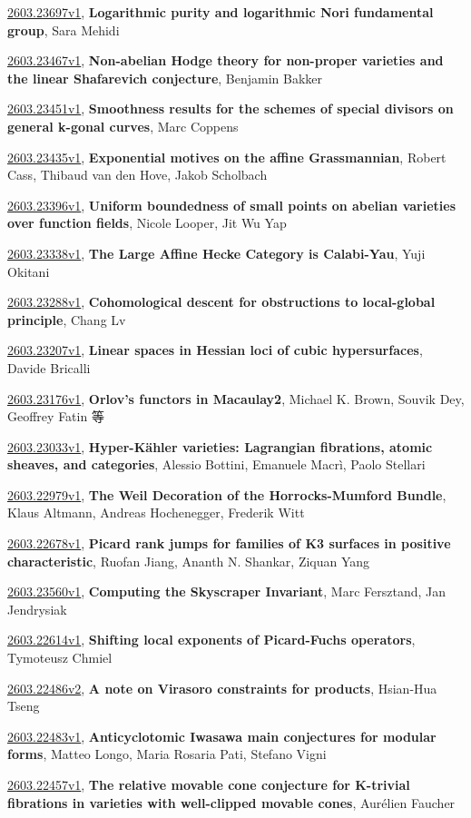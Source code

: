 \documentclass[9pt, a4paper]{article}
\theoremstyle{plain}
\theoremstyle{definition}
\theoremstyle{remark}
\newcommand{\arxiv}[3]{\href{https://arxiv.org/abs/#1}{#1}, \textbf{\textcolor{arxivblue}{#2}}, #3}
\begin{document}
\arxiv{2603.23697v1}{Logarithmic purity and logarithmic Nori fundamental group}{Sara Mehidi}

\arxiv{2603.23467v1}{Non-abelian Hodge theory for non-proper varieties and the linear Shafarevich conjecture}{Benjamin Bakker}

\arxiv{2603.23451v1}{Smoothness results for the schemes of special divisors on general k-gonal curves}{Marc Coppens}

\arxiv{2603.23435v1}{Exponential motives on the affine Grassmannian}{Robert Cass, Thibaud van den Hove, Jakob Scholbach}

\arxiv{2603.23396v1}{Uniform boundedness of small points on abelian varieties over function fields}{Nicole Looper, Jit Wu Yap}

\arxiv{2603.23338v1}{The Large Affine Hecke Category is Calabi-Yau}{Yuji Okitani}

\arxiv{2603.23288v1}{Cohomological descent for obstructions to local-global principle}{Chang Lv}

\arxiv{2603.23207v1}{Linear spaces in Hessian loci of cubic hypersurfaces}{Davide Bricalli}

\arxiv{2603.23176v1}{Orlov's functors in Macaulay2}{Michael K. Brown, Souvik Dey, Geoffrey Fatin 等}

\arxiv{2603.23033v1}{Hyper-Kähler varieties: Lagrangian fibrations, atomic sheaves, and categories}{Alessio Bottini, Emanuele Macrì, Paolo Stellari}

\arxiv{2603.22979v1}{The Weil Decoration of the Horrocks-Mumford Bundle}{Klaus Altmann, Andreas Hochenegger, Frederik Witt}

\arxiv{2603.22678v1}{Picard rank jumps for families of K3 surfaces in positive characteristic}{Ruofan Jiang, Ananth N. Shankar, Ziquan Yang}

\arxiv{2603.23560v1}{Computing the Skyscraper Invariant}{Marc Fersztand, Jan Jendrysiak}

\arxiv{2603.22614v1}{Shifting local exponents of Picard-Fuchs operators}{Tymoteusz Chmiel}

\arxiv{2603.22486v2}{A note on Virasoro constraints for products}{Hsian-Hua Tseng}

\arxiv{2603.22483v1}{Anticyclotomic Iwasawa main conjectures for modular forms}{Matteo Longo, Maria Rosaria Pati, Stefano Vigni}

\arxiv{2603.22457v1}{The relative movable cone conjecture for K-trivial fibrations in varieties with well-clipped movable cones}{Aurélien Faucher}
\end{document}

